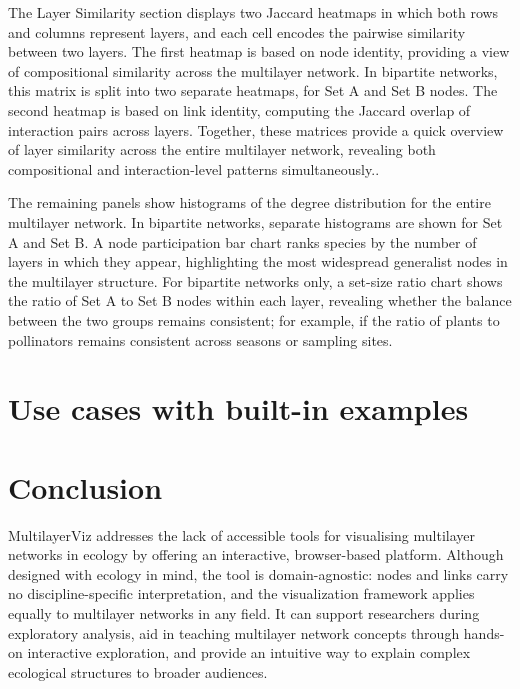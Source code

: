 \documentclass{article}
\begin{document}
The Layer Similarity section displays two Jaccard heatmaps in which both rows and columns represent layers, and each cell encodes the pairwise similarity between two layers. The first heatmap is based on node identity, providing a view of compositional similarity across the multilayer network. In bipartite networks, this matrix is split into two separate heatmaps,  for Set A and Set B nodes. The second heatmap is based on link identity, computing the Jaccard overlap of interaction pairs across layers. Together, these matrices provide a quick overview of layer similarity across the entire multilayer network, revealing both compositional and interaction-level patterns simultaneously..

The remaining panels show histograms of the degree distribution for the entire multilayer network. In bipartite networks, separate histograms are shown for Set A and Set B. A node participation bar chart ranks species by the number of layers in which they appear, highlighting the most widespread generalist nodes in the multilayer structure. For bipartite networks only, a set-size ratio chart shows the ratio of Set A to Set B nodes within each layer, revealing whether the balance between the two groups remains consistent; for example, if the ratio of plants to pollinators remains consistent across seasons or sampling sites.


\section{Use cases with built-in examples}


\section{Conclusion}
MultilayerViz addresses the lack of accessible tools for visualising multilayer networks in ecology by offering an interactive, browser-based platform. Although designed with ecology in mind, the tool is domain-agnostic: nodes and links carry no discipline-specific interpretation, and the visualization framework applies equally to multilayer networks in any field. It can support researchers during exploratory analysis, aid in teaching multilayer network concepts through hands-on interactive exploration, and provide an intuitive way to explain complex ecological structures to broader audiences. 
\end{document}

